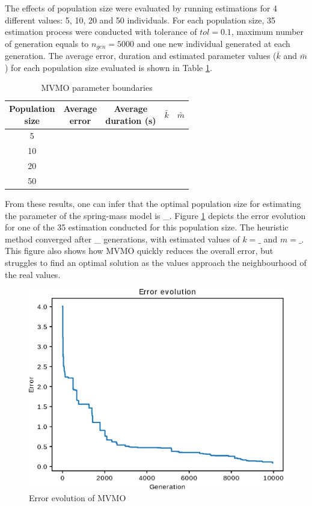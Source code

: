The effects of population size were evaluated by running estimations for 4 different values: 5, 10, 20 and 50 individuals. For each population size, 35 estimation process were conducted with tolerance of $tol = 0.1$, maximum number of generation equals to $n_{gen}=5000$ and one new individual generated at each generation. The average error, duration and estimated parameter values ($\bar{k}$ and $\bar{m}$) for each population size evaluated is shown in Table \ref{tab: spring_mass_MVMO_size}.

\begin{table}[!h]
	\centering
	\caption{MVMO parameter boundaries}
	\begin{tabular}{c|cccc}
		\shortstack{Population \\ size} & \shortstack{Average \\ error} & \shortstack{Average \\ duration (s)} & $\bar{k}$ & $\bar{m}$ \\
		\hline
		5 &  &  &  & \\
		10 &  &  &  & \\
		20 &  &  &  & \\
		50 &  &  &  & \\
	\end{tabular}
	\label{tab: spring_mass_MVMO_size}
\end{table}

From these results, one can infer that the optimal population size for estimating the parameter of the spring-mass model is \_. Figure \ref{fig: MVMO_conv} depicts the error evolution for one of the 35 estimation conducted for this population size. The heuristic method converged after \_ generations, with estimated values of $k=\_$ and $m=\_$. This figure also shows how MVMO quickly reduces the overall error, but struggles to find an optimal solution as the values approach the neighbourhood of the real values.

\begin{figure}[h]
	\caption{Error evolution of MVMO}
	\begin{center}
		\includegraphics[scale=0.6]{Images/MVMO_conv.eps}
	\end{center}
	\label{fig: MVMO_conv}
\end{figure}

